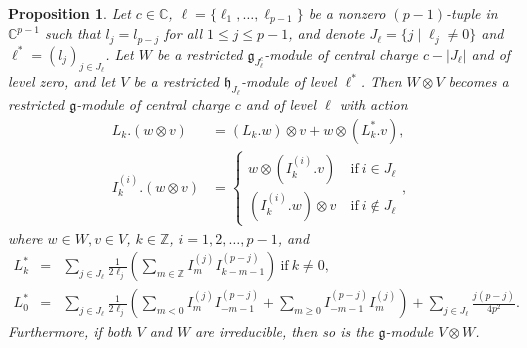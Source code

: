 \documentclass[12pt, reqno]{amsart}
\numberwithin{equation}{section}
\newtheorem{proposition}[theorem]{Proposition}%
\numberwithin{equation}{section}
\def\h{\mathfrak{h}}
\def\g{\mathfrak{g}}
\def\({\left(}
\def\){\right)}
\newcommand{\C}{\mathbb C}
\newcommand{\Z}{\mathbb{Z}}
\newcommand{\elei}[2]{I_{#1}^{(#2)}}
\begin{document}
\begin{proposition}\label{main}
 Let $c\in \C$, $\bm{\ell}=\{\ell_1,\dots,\ell_{p-1}\}$ be a nonzero $(p-1)$-tuple in $\C^{p-1}$ such that $l_j=l_{p-j}$ for all $1\le j\le p-1$, and
 denote $J_{\bm\ell}=\{j\mid \ell_j\neq 0\}$ and $\bm\ell^*=(l_j)_{j\in J_{\bm\ell}}$.
 Let $W$ be a restricted $\g_{J^c_{\bm{\ell}}}$-module of central charge $c-|J_{\bm{\ell}}|$ and of level zero,
 and let $V$ be a restricted $\h_{J_{\bm{\ell}}}$-module of level $\bm{\ell}^*$.
 Then $W\otimes V$ becomes a restricted $\g$-module of central charge $c$ and of level $\bm{\ell}$ with action
 \begin{equation*}\begin{split}
  L_k.(w\otimes v)&=(L_k.w)\otimes v+ w\otimes (L^*_k.v),\\
  I_k^{(i)}.(w\otimes v)&= \begin{cases} w\otimes (I_k^{(i)}.v)\ &\text{if}\ i\in J_{\bm\ell}\\
  (I_k^{(i)}.w)\otimes v\ &\text{if}\ i\notin J_{\bm\ell}
 \end{cases},
 \end{split}\end{equation*}
 where $w\in W, v\in V$, $k\in \Z$, $i=1,2,\dots,p-1$,  and
 \begin{eqnarray*}
  L^*_k&=& \sum_{j\in J_{\bm\ell}} \frac{1}{2\ell_j}\(\sum_{m\in \Z} I_m^{(j)}I_{k-m-1}^{(p-j)}\)\ \text{if}\ k\ne 0,\\
  L^*_0&=& \sum_{j\in J_{\bm\ell}} \frac{1}{2\ell_j}\(\sum_{m<0} \elei mj\elei {-m-1}{p-j}+
  \sum_{m\geq 0}\elei {-m-1}{p-j}\elei mj\)+\sum_{j\in J_{\bm\ell}}\frac{j(p-j)}{4 p^2}.
 \end{eqnarray*}
 Furthermore, if both $V$ and $W$ are irreducible, then so is the $\g$-module $V\otimes W$.
\end{proposition}
\end{document}
